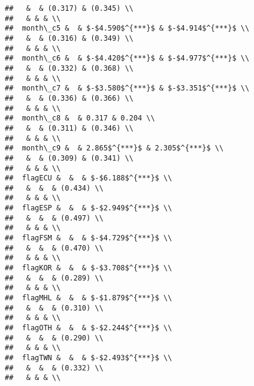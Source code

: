 \documentclass[11pt,]{article}
\begin{document}
\begin{verbatim}
##   &  & (0.317) & (0.345) \\ 
##   & & & \\ 
##  month\_c5 &  & $-$4.590$^{***}$ & $-$4.914$^{***}$ \\ 
##   &  & (0.316) & (0.349) \\ 
##   & & & \\ 
##  month\_c6 &  & $-$4.420$^{***}$ & $-$4.977$^{***}$ \\ 
##   &  & (0.332) & (0.368) \\ 
##   & & & \\ 
##  month\_c7 &  & $-$3.580$^{***}$ & $-$3.351$^{***}$ \\ 
##   &  & (0.336) & (0.366) \\ 
##   & & & \\ 
##  month\_c8 &  & 0.317 & 0.204 \\ 
##   &  & (0.311) & (0.346) \\ 
##   & & & \\ 
##  month\_c9 &  & 2.865$^{***}$ & 2.305$^{***}$ \\ 
##   &  & (0.309) & (0.341) \\ 
##   & & & \\ 
##  flagECU &  &  & $-$6.188$^{***}$ \\ 
##   &  &  & (0.434) \\ 
##   & & & \\ 
##  flagESP &  &  & $-$2.949$^{***}$ \\ 
##   &  &  & (0.497) \\ 
##   & & & \\ 
##  flagFSM &  &  & $-$4.729$^{***}$ \\ 
##   &  &  & (0.470) \\ 
##   & & & \\ 
##  flagKOR &  &  & $-$3.708$^{***}$ \\ 
##   &  &  & (0.289) \\ 
##   & & & \\ 
##  flagMHL &  &  & $-$1.879$^{***}$ \\ 
##   &  &  & (0.310) \\ 
##   & & & \\ 
##  flagOTH &  &  & $-$2.244$^{***}$ \\ 
##   &  &  & (0.290) \\ 
##   & & & \\ 
##  flagTWN &  &  & $-$2.493$^{***}$ \\ 
##   &  &  & (0.332) \\ 
##   & & & \\ 

\end{verbatim}
\end{document}
